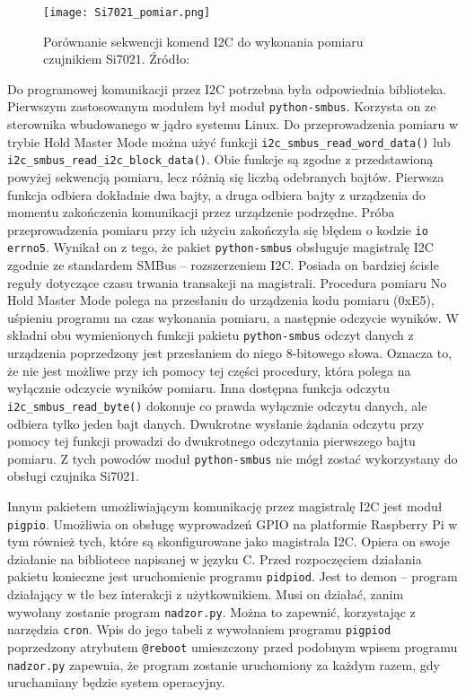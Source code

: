 \documentclass[a4paper,11pt,twoside]{article}
\begin{document}
\begin{figure}[H]
\begin{center}
\texttt{[image: Si7021\_pomiar.png]}
\caption{Porównanie sekwencji komend I2C do wykonania pomiaru czujnikiem Si7021. Źródło: \cite{czujnik_temp}}
\label{fig: metody_pomiaru}
\end{center}
\end{figure}

Do programowej komunikacji przez I2C potrzebna była odpowiednia biblioteka. Pierwszym zastosowanym modułem był moduł \texttt{python-smbus}. Korzysta on ze sterownika wbudowanego w jądro systemu Linux. Do przeprowadzenia pomiaru w trybie Hold Master Mode można użyć funkcji \texttt{i2c{\_}smbus{\_}read{\_}word{\_}data()} lub \texttt{i2c{\_}smbus{\_}read{\_}i2c{\_}block{\_}data()}. Obie funkcje są zgodne z przedstawioną powyżej sekwencją pomiaru, lecz różnią się liczbą odebranych bajtów. Pierwsza funkcja odbiera dokładnie dwa bajty, a druga odbiera bajty z urządzenia do momentu zakończenia komunikacji przez urządzenie podrzędne\cite{smbus}. Próba przeprowadzenia pomiaru przy ich użyciu zakończyła się błędem o kodzie \texttt{io errno5}. Wynikał on z tego, że pakiet \texttt{python-smbus} obsługuje magistralę I2C zgodnie ze standardem SMBus -- rozszerzeniem I2C. Posiada on bardziej ścisłe reguły dotyczące czasu trwania transakcji na magistrali. Procedura pomiaru No Hold Master Mode polega na przesłaniu do urządzenia kodu pomiaru (0xE5), uśpieniu programu na czas wykonania pomiaru, a następnie odczycie wyników. W składni obu wymienionych funkcji pakietu \texttt{python-smbus} odczyt danych z urządzenia poprzedzony jest przesłaniem do niego 8-bitowego słowa. Oznacza to, że nie jest możliwe przy ich pomocy tej części procedury, która polega na wyłącznie odczycie wyników pomiaru. Inna dostępna funkcja odczytu \texttt{i2c{\_}smbus{\_}read{\_}byte()} dokonuje co prawda wyłącznie odczytu danych, ale odbiera tylko jeden bajt danych. Dwukrotne wysłanie żądania odczytu przy pomocy tej funkcji prowadzi do dwukrotnego odczytania pierwszego bajtu pomiaru. Z tych powodów moduł \texttt{python-smbus} nie mógł zostać wykorzystany do obsługi czujnika Si7021. 

Innym pakietem umożliwiającym komunikację przez magistralę I2C jest moduł \texttt{pigpio}. Umożliwia on obsługę wyprowadzeń GPIO na platformie Raspberry Pi w tym również tych, które są skonfigurowane jako magistrala I2C. Opiera on swoje działanie na bibliotece napisanej w języku C. Przed rozpoczęciem działania pakietu konieczne jest uruchomienie programu \texttt{pidpiod}. Jest to demon -- program działający w tle bez interakcji z użytkownikiem. Musi on działać, zanim wywołany zostanie program \texttt{nadzor.py}. Można to zapewnić, korzystając z narzędzia \texttt{cron}. Wpis do jego tabeli z wywołaniem programu \texttt{pigpiod} poprzedzony atrybutem \texttt{@reboot} umieszczony przed podobnym wpisem programu \texttt{nadzor.py} zapewnia, że program zostanie uruchomiony za każdym razem, gdy uruchamiany będzie system operacyjny.
\end{document}
